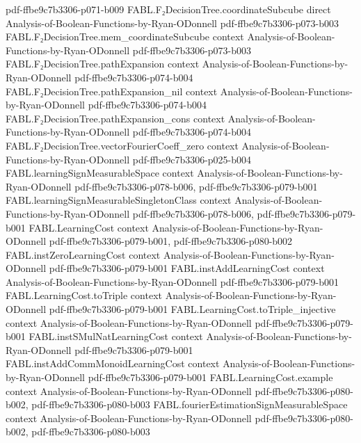 \begin{theorem}
  {pdf-ffbe9c7b3306-p071-b009}
\proofstep
  {FABL.F₂DecisionTree.coordinateSubcube}
  {direct}
  {Analysis-of-Boolean-Functions-by-Ryan-ODonnell}
  {pdf-ffbe9c7b3306-p073-b003}
\proofstep
  {FABL.F₂DecisionTree.mem_coordinateSubcube}
  {context}
  {Analysis-of-Boolean-Functions-by-Ryan-ODonnell}
  {pdf-ffbe9c7b3306-p073-b003}
\proofstep
  {FABL.F₂DecisionTree.pathExpansion}
  {context}
  {Analysis-of-Boolean-Functions-by-Ryan-ODonnell}
  {pdf-ffbe9c7b3306-p074-b004}
\proofstep
  {FABL.F₂DecisionTree.pathExpansion_nil}
  {context}
  {Analysis-of-Boolean-Functions-by-Ryan-ODonnell}
  {pdf-ffbe9c7b3306-p074-b004}
\proofstep
  {FABL.F₂DecisionTree.pathExpansion_cons}
  {context}
  {Analysis-of-Boolean-Functions-by-Ryan-ODonnell}
  {pdf-ffbe9c7b3306-p074-b004}
\proofstep
  {FABL.F₂DecisionTree.vectorFourierCoeff_zero}
  {context}
  {Analysis-of-Boolean-Functions-by-Ryan-ODonnell}
  {pdf-ffbe9c7b3306-p025-b004}
\proofstep
  {FABL.learningSignMeasurableSpace}
  {context}
  {Analysis-of-Boolean-Functions-by-Ryan-ODonnell}
  {pdf-ffbe9c7b3306-p078-b006,
    pdf-ffbe9c7b3306-p079-b001}
\proofstep
  {FABL.learningSignMeasurableSingletonClass}
  {context}
  {Analysis-of-Boolean-Functions-by-Ryan-ODonnell}
  {pdf-ffbe9c7b3306-p078-b006,
    pdf-ffbe9c7b3306-p079-b001}
\proofstep
  {FABL.LearningCost}
  {context}
  {Analysis-of-Boolean-Functions-by-Ryan-ODonnell}
  {pdf-ffbe9c7b3306-p079-b001,
    pdf-ffbe9c7b3306-p080-b002}
\proofstep
  {FABL.instZeroLearningCost}
  {context}
  {Analysis-of-Boolean-Functions-by-Ryan-ODonnell}
  {pdf-ffbe9c7b3306-p079-b001}
\proofstep
  {FABL.instAddLearningCost}
  {context}
  {Analysis-of-Boolean-Functions-by-Ryan-ODonnell}
  {pdf-ffbe9c7b3306-p079-b001}
\proofstep
  {FABL.LearningCost.toTriple}
  {context}
  {Analysis-of-Boolean-Functions-by-Ryan-ODonnell}
  {pdf-ffbe9c7b3306-p079-b001}
\proofstep
  {FABL.LearningCost.toTriple_injective}
  {context}
  {Analysis-of-Boolean-Functions-by-Ryan-ODonnell}
  {pdf-ffbe9c7b3306-p079-b001}
\proofstep
  {FABL.instSMulNatLearningCost}
  {context}
  {Analysis-of-Boolean-Functions-by-Ryan-ODonnell}
  {pdf-ffbe9c7b3306-p079-b001}
\proofstep
  {FABL.instAddCommMonoidLearningCost}
  {context}
  {Analysis-of-Boolean-Functions-by-Ryan-ODonnell}
  {pdf-ffbe9c7b3306-p079-b001}
\proofstep
  {FABL.LearningCost.example}
  {context}
  {Analysis-of-Boolean-Functions-by-Ryan-ODonnell}
  {pdf-ffbe9c7b3306-p080-b002,
    pdf-ffbe9c7b3306-p080-b003}
\proofstep
  {FABL.fourierEstimationSignMeasurableSpace}
  {context}
  {Analysis-of-Boolean-Functions-by-Ryan-ODonnell}
  {pdf-ffbe9c7b3306-p080-b002,
    pdf-ffbe9c7b3306-p080-b003}

\end{theorem}
